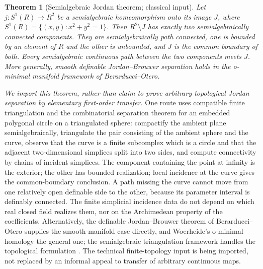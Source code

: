 \documentclass[11pt,letterpaper]{article}
\newtheorem{theorem}{Theorem}[section]
\theoremstyle{definition}
\theoremstyle{remark}
\numberwithin{equation}{section}
\begin{document}
\begin{theorem}[Semialgebraic Jordan theorem; classical input]
\label{contours:thm:sajordan}
Let $j:S^1(R)\to R^2$ be a semialgebraic homeomorphism onto its image $J$, where
$S^1(R)=\{(x,y):x^2+y^2=1\}$. Then $R^2\setminus J$ has exactly two
semialgebraically connected components. They are semialgebraically path connected,
one is bounded by an element of $R$ and the other is unbounded, and $J$ is the
common boundary of both. Every semialgebraic continuous path between the two
components meets $J$. More generally, smooth definable Jordan--Brouwer separation
holds in the o-minimal manifold framework of Berarducci--Otero.
\end{theorem}

\emph{We import this theorem, rather than claim to prove arbitrary topological
Jordan separation by elementary first-order transfer.} One route uses compatible
finite triangulation and the combinatorial separation theorem for an embedded
polygonal circle on a triangulated sphere: compactify the ambient plane
semialgebraically, triangulate the pair consisting of the ambient sphere and the
curve, observe that the curve is a finite subcomplex which is a circle and that the
adjacent two-dimensional simplices split into two sides, and compute connectivity
by chains of incident simplices. The component containing the point at infinity is
the exterior; the other has bounded realization; local incidence at the curve gives
the common-boundary conclusion. A path missing the curve cannot move from one
relatively open definable side to the other, because its parameter interval is
definably connected. The finite simplicial incidence data do not depend on which
real closed field realizes them, nor on the Archimedean property of the
coefficients. Alternatively, the definable Jordan--Brouwer theorem of
Berarducci--Otero supplies the smooth-manifold case directly, and Woerheide's
o-minimal homology the general one; the semialgebraic triangulation framework
handles the topological formulation \cite{BCR,BO,BOhomology,Woerheide,OS}. The
technical finite-topology input is being imported, not replaced by an informal
appeal to transfer of arbitrary continuous maps.
\end{document}
